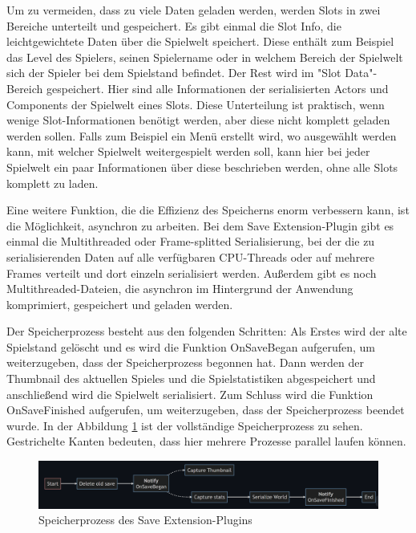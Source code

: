 Um zu vermeiden, dass zu viele Daten geladen werden, werden Slots in zwei Bereiche unterteilt und gespeichert. Es gibt einmal die Slot Info, die leichtgewichtete Daten über die Spielwelt speichert. Diese enthält zum Beispiel das Level des Spielers, seinen Spielername oder in welchem Bereich der Spielwelt sich der Spieler bei dem Spielstand befindet. Der Rest wird im "Slot Data"-Bereich gespeichert. Hier sind alle Informationen der serialisierten Actors und Components der Spielwelt eines Slots. Diese Unterteilung ist praktisch, wenn wenige Slot-Informationen benötigt werden, aber diese nicht komplett geladen werden sollen. Falls zum Beispiel ein Menü erstellt wird, wo ausgewählt werden kann, mit welcher Spielwelt weitergespielt werden soll, kann hier bei jeder Spielwelt ein paar Informationen über diese beschrieben werden, ohne alle Slots komplett zu laden.\cite{piperiftPiperiftSaveSlot}

Eine weitere Funktion, die die Effizienz des Speicherns enorm verbessern kann, ist die Möglichkeit, asynchron zu arbeiten. Bei dem Save Extension-Plugin gibt es einmal die Multithreaded oder Frame-splitted Serialisierung, bei der die zu serialisierenden Daten auf alle verfügbaren CPU-Threads oder auf mehrere Frames verteilt und dort einzeln serialisiert werden. Außerdem gibt es noch Multithreaded-Dateien, die asynchron im Hintergrund der Anwendung komprimiert, gespeichert und geladen werden.\cite{piperiftPiperiftSaveMultithreaded}

Der Speicherprozess besteht aus den folgenden Schritten: Als Erstes wird der alte Spielstand gelöscht und es wird die Funktion OnSaveBegan aufgerufen, um weiterzugeben, dass der Speicherprozess begonnen hat. Dann werden der Thumbnail des aktuellen Spieles und die Spielstatistiken abgespeichert und anschließend wird die Spielwelt serialisiert. Zum Schluss wird die Funktion OnSaveFinished aufgerufen, um weiterzugeben, dass der Speicherprozess beendet wurde. In der Abbildung \ref{fig:piperiftSaveProcess} ist der vollständige Speicherprozess zu sehen. Gestrichelte Kanten bedeuten, dass hier mehrere Prozesse parallel laufen können.\cite{piperiftSaveProcess}

\begin{figure}[htp]
    \centering
    \includegraphics[width=1\textwidth]{images/piperift_save_process.png}
    \caption{Speicherprozess des Save Extension-Plugins \cite{piperiftSaveProcess}}
    \label{fig:piperiftSaveProcess}
\end{figure}

